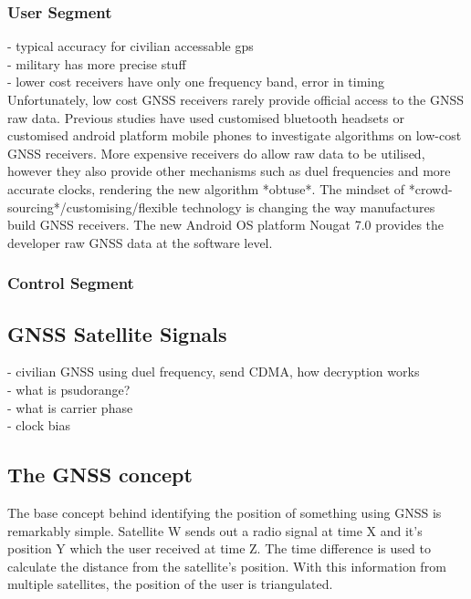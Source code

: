 \documentclass[11pt,a4paper]{article}
\begin{document}
\subsubsection{User Segment}
- typical accuracy for civilian accessable gps\\
- military has more precise stuff\\
- lower cost receivers have only one frequency band, error in timing\\
Unfortunately, low cost GNSS receivers rarely provide official access to the GNSS raw data. Previous studies have used customised bluetooth headsets or customised android platform mobile phones to investigate algorithms on low-cost GNSS receivers. More expensive receivers do allow raw data to be utilised, however they also provide other mechanisms such as duel frequencies and more accurate clocks, rendering the new algorithm *obtuse*. The mindset of *crowd-sourcing*/customising/flexible technology is changing the way manufactures build GNSS receivers. The new Android OS platform Nougat 7.0 provides the developer raw GNSS data at the software level.  

\subsubsection{Control Segment}


\subsection{GNSS Satellite Signals}
- civilian GNSS using duel frequency, send CDMA, how decryption works\\
- what is psudorange?\\
- what is carrier phase\\
- clock bias\\






\subsection{The GNSS concept}
The base concept behind identifying the position of something using GNSS is remarkably simple. Satellite W sends out a radio signal at time X and it's position Y which the user received at time Z. The time difference is used to calculate the distance from the satellite's position. With this information from multiple satellites, the position of the user is triangulated. 
\end{document}
